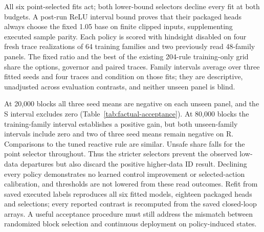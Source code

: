 \documentclass[10pt]{article}
\begin{document}
All six point-selected fits act; both lower-bound selectors decline every fit at both budgets. A post-run ReLU interval bound proves that their packaged heads always choose the fixed 1.05 base on finite clipped inputs, supplementing executed sample parity. Each policy is scored with hindsight disabled on four fresh trace realizations of 64 training families and two previously read 48-family panels. The fixed ratio and the best of the existing 204-rule training-only grid share the options, governor and paired traces. Family intervals average over three fitted seeds and four traces and condition on those fits; they are descriptive, unadjusted across evaluation contrasts, and neither unseen panel is blind.

\begin{table}[t]
\centering\small
\resizebox{\linewidth}{!}{}
\caption{Original point-selected factual policies: closed-loop utility difference from training-selected fixed 1.05 and change in unsafe share. Brackets are conditional family-level 95\% $t$ intervals. Both clustered lower-bound selectors exactly reproduce fixed control at both budgets.}\label{tab:factual-acceptance}
\end{table}

At 20,000 blocks all three seed means are negative on each unseen panel, and the S interval excludes zero (Table~\ref{tab:factual-acceptance}). At 80,000 blocks the training-family interval establishes a positive gain, but both unseen-family intervals include zero and two of three seed means remain negative on R. Comparisons to the tuned reactive rule are similar. Unsafe share falls for the point selector throughout. Thus the stricter selectors prevent the observed low-data departures but also discard the positive higher-data ID result. Declining every policy demonstrates no learned control improvement or selected-action calibration, and thresholds are not lowered from these read outcomes. Refit from saved executed labels reproduces all six fitted models, eighteen packaged heads and selections; every reported contrast is recomputed from the saved closed-loop arrays. A useful acceptance procedure must still address the mismatch between randomized block selection and continuous deployment on policy-induced states.
\end{document}
